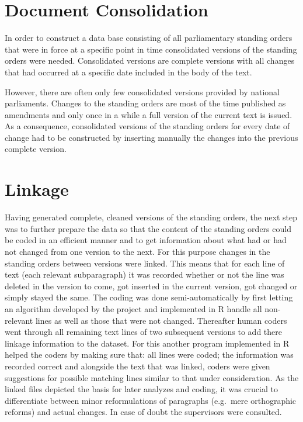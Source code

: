 \documentclass[]{article}
\begin{document}
\section{Document Consolidation}\label{document-consolidation}

In order to construct a data base consisting of all parliamentary
standing orders that were in force at a specific point in time
consolidated versions of the standing orders were needed. Consolidated
versions are complete versions with all changes that had occurred at a
specific date included in the body of the text.

However, there are often only few consolidated versions provided by
national parliaments. Changes to the standing orders are most of the
time published as amendments and only once in a while a full version of
the current text is issued. As a consequence, consolidated versions of
the standing orders for every date of change had to be constructed by
inserting manually the changes into the previous complete version.

\section{Linkage}\label{linkage}

Having generated complete, cleaned versions of the standing orders, the
next step was to further prepare the data so that the content of the
standing orders could be coded in an efficient manner and to get
information about what had or had not changed from one version to the
next. For this purpose changes in the standing orders between versions
were linked. This means that for each line of text (each relevant
subparagraph) it was recorded whether or not the line was deleted in the
version to come, got inserted in the current version, got changed or
simply stayed the same. The coding was done semi-automatically by first
letting an algorithm developed by the project and implemented in R
handle all non-relevant lines as well as those that were not changed.
Thereafter human coders went through all remaining text lines of two
subsequent versions to add there linkage information to the dataset. For
this another program implemented in R helped the coders by making sure
that: all lines were coded; the information was recorded correct and
alongside the text that was linked, coders were given suggestions for
possible matching lines similar to that under consideration. As the
linked files depicted the basis for later analyzes and coding, it was
crucial to differentiate between minor reformulations of paragraphs
(e.g.~mere orthographic reforms) and actual changes. In case of doubt
the supervisors were consulted.
\end{document}
